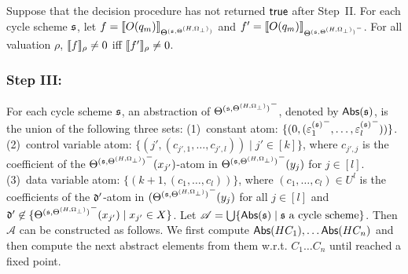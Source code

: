 \begin{lemma}\label{prop-bnd-domain-1}
	Suppose that the decision procedure has not returned $\mathsf{true}$ after Step~II. For each cycle scheme ${\mathfrak{s} }$, let $f=\llbracket O(q_m)\rrbracket_{\Theta^{({\mathfrak{s} }, \Theta^{(H,\Omega_\bot)})}}$ and $f'=\llbracket O(q_m)\rrbracket_{{\Theta^{({\mathfrak{s} }, \Theta^{(H,\Omega_\bot)})}}^-}$. For all valuation $\rho$, $\llbracket f\rrbracket_{\rho}\neq 0$ iff $\llbracket f'\rrbracket_{\rho} \neq 0$.
\end{lemma}



\subsubsection{Step III:} 
For each cycle scheme ${\mathfrak{s} }$, an abstraction of ${\Theta^{({\mathfrak{s} }, \Theta^{(H,\Omega_\bot)})}}^-$, denoted by $\mathsf{Abs}({\mathfrak{s} })$,  is the union of the following three sets:
(1)~constant atom: $\{(0, ( {\varepsilon^{({\mathfrak{s} })}_{1}}^-,\dots, {\varepsilon^{({\mathfrak{s} })}_l}^-))\}$. 
(2)~control variable atom: $\{(j', (c_{j',1},\dots, c_{j', l})) \mid j' \in [k]\}$, where $c_{j', j}$ is the coefficient of the ${\Theta^{({\mathfrak{s} },\Theta^{(H,\Omega_\bot)})}}^-(x_{j'})$-atom in ${\Theta^{({\mathfrak{s} },\Theta^{(H,\Omega_\bot)})}}^-(y_{j})$ for $j\in[l]$. (3)~data variable atom: $\{(k+1, (c_1,\dots,c_l))\}$, where $(c_1,\dots,c_l) \in U^l$ is the coefficients of the $\mathfrak{d}'$-atom in ${(\Theta^{({\mathfrak{s} },\Theta^{(H,\Omega_\bot)})}}^-(y_{j})$ for all $j \in [l]$ and $\mathfrak{d}'\not\in \{{\Theta^{({\mathfrak{s} },\Theta^{(H,\Omega_\bot)})}}^-(x_{j'})\mid x_{j'}\in X\}$.
Let $\mathscr{A}=\bigcup \{\mathsf{Abs}({\mathfrak{s} }) \mid {\mathfrak{s} } \mbox{ a cycle scheme}\}$. Then $\mathscr{A}$ can be constructed as follows. We first compute $\mathsf{Abs}(HC_1), \ldots \mathsf{Abs}(HC_n)$ and then compute the next abstract elements from them w.r.t. $C_1\ldots C_n$ until reached a fixed point.

